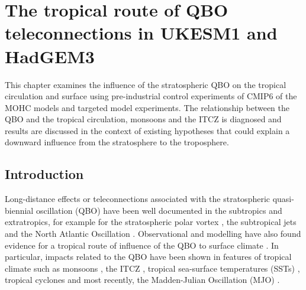 \chapter{\label{ch:7-qbo} The tropical route of QBO teleconnections in UKESM1 and HadGEM3 }

This chapter examines the influence of the stratospheric QBO on the tropical circulation and surface using pre-industrial control experiments of CMIP6 of the MOHC models and targeted model experiments. The relationship between the QBO and the tropical circulation, monsoons and the ITCZ is diagnosed and results are discussed in the context of existing hypotheses that could explain a downward influence from the stratosphere to the troposphere.

\section{Introduction}

Long-distance effects or teleconnections associated with the stratospheric quasi-biennial oscillation (QBO) have been well documented in the subtropics and extratropics, for example for the stratospheric polar vortex \citep{holton1980,anstey2014,lu2020}, the subtropical jets \citep{garfinkel2011,hansen2016tropospheric} and the North Atlantic Oscillation \citep{hansen2016tropospheric,gray2018,andrews2019observed}.  
 Observational and modelling have also found evidence for a tropical route of influence of the QBO to surface climate \citep{gray2018,hitchman2021observational}. In particular, impacts related to the QBO have been shown in features of tropical climate such as monsoons \citep{giorgetta1999,claud2007revisiting,liess2012}, the ITCZ \citep{gray2018}, tropical sea-surface temperatures (SSTs) \citep{gray1984,garfinkel2011,huang2012connection}, tropical cyclones \citep{ho2009,jaramillo2021combined} and most recently, the Madden-Julian Oscillation (MJO) \citep{lee2018,wang2019,martin2020jgr}. 

